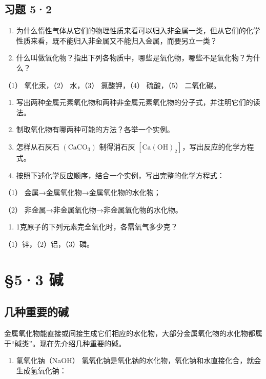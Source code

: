 \subsection{习题 5·2}

\begin{enumerate}
\item
  为什么惰性气体从它们的物理性质来看可以归入非金属一类，但从它们的化学性质来看，既不能归入非金属又不能归入金属，而要另立一类？
\item
  什么叫做氧化物？指出下列各物质中，哪些是氧化物，哪些不是氧化物？为什么？
\end{enumerate}

（1） 氧化汞，（2） 水，（3） 氯酸钾，（4） 硫酸，（5） 二氧化碳。

\begin{enumerate}[start=3]
\item
  写出两种金属元素氧化物和两种非金属元素氧化物的分子式，并注明它们的读法。
\item
  制取氧化物有哪两种可能的方法？各举一个实例。
\item
  怎样从石灰石 \((\mathrm{CaCO}_3)\) 制得消石灰
  \([\mathrm{Ca(OH)}_2]\)，写出反应的化学方程式。
\item
  按照下述化学反应顺序，结合一个实例，写出完整的化学方程式：
\end{enumerate}

（1） 金属→金属氧化物→金属氧化物的水化物；

（2） 非金属→非金属氧化物→非金属氧化物的水化物。

\begin{enumerate}[start=7]
\item
  1克原子的下列元素完全氧化时，各需氧气多少克？
\end{enumerate}

（1）锌，（2）铝，（3）磷。

\section{§5·3 碱}

\subsection{几种重要的碱}

金属氧化物能直接或间接生成它们相应的水化物，大部分金属氧化物的水化物都属于``碱类''。现在先介绍几种重要的碱。

\begin{enumerate}
\item
  氢氧化钠（NaOH）
  氢氧化钠是氧化钠的水化物，氧化钠和水直接化合，就会生成氢氧化钠：
\end{enumerate}

